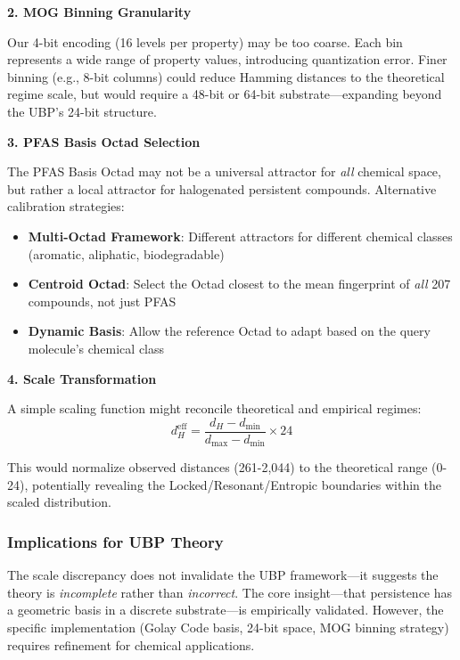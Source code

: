 \documentclass[11pt,letterpaper]{article}
\begin{document}
\textbf{2. MOG Binning Granularity}

Our 4-bit encoding (16 levels per property) may be too coarse. Each bin represents a wide range of property values, introducing quantization error. Finer binning (e.g., 8-bit columns) could reduce Hamming distances to the theoretical regime scale, but would require a 48-bit or 64-bit substrate—expanding beyond the UBP's 24-bit structure.

\textbf{3. PFAS Basis Octad Selection}

The PFAS Basis Octad may not be a universal attractor for \textit{all} chemical space, but rather a local attractor for halogenated persistent compounds. Alternative calibration strategies:
\begin{itemize}
    \item \textbf{Multi-Octad Framework}: Different attractors for different chemical classes (aromatic, aliphatic, biodegradable)
    \item \textbf{Centroid Octad}: Select the Octad closest to the mean fingerprint of \textit{all} 207 compounds, not just PFAS
    \item \textbf{Dynamic Basis}: Allow the reference Octad to adapt based on the query molecule's chemical class
\end{itemize}

\textbf{4. Scale Transformation}

A simple scaling function might reconcile theoretical and empirical regimes:
\begin{equation}
d_H^{\text{eff}} = \frac{d_H - d_{\min}}{d_{\max} - d_{\min}} \times 24
\end{equation}

This would normalize observed distances (261-2,044) to the theoretical range (0-24), potentially revealing the Locked/Resonant/Entropic boundaries within the scaled distribution.

\subsubsection{Implications for UBP Theory}

The scale discrepancy does not invalidate the UBP framework—it suggests the theory is \textit{incomplete} rather than \textit{incorrect}. The core insight—that persistence has a geometric basis in a discrete substrate—is empirically validated. However, the specific implementation (Golay Code basis, 24-bit space, MOG binning strategy) requires refinement for chemical applications.
\end{document}

